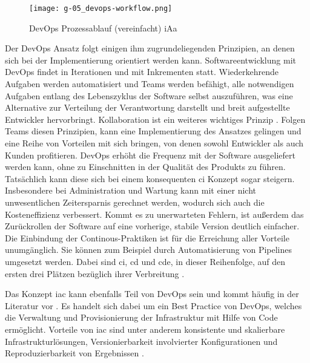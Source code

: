 \begin{figure}[h]
    \centering
    \texttt{[image: g-05\_devops-workflow.png]}
    \caption{DevOps Prozessablauf (vereinfacht) \acrshort{iAa} \citeauthor{008:GitOps-Approach-to-Cloud-Cluster-System-Deployment}}
    \label{fig:g-05_devops-workflow}
\end{figure}

Der DevOps Ansatz folgt einigen ihm zugrundeliegenden Prinzipien, an denen sich bei der Implementierung orientiert werden kann. Softwareentwicklung mit DevOps findet in Iterationen und mit Inkrementen statt. Wiederkehrende Aufgaben werden automatisiert und Teams werden befähigt, alle notwendigen Aufgaben entlang des Lebenszyklus der Software selbst auszuführen, was eine Alternative zur Verteilung der Verantwortung darstellt und breit aufgestellte Entwickler hervorbringt. Kollaboration ist ein weiteres wichtiges Prinzip \cite{009:GitOps-Evolution-of-DevOps}. Folgen Teams diesen Prinzipien, kann eine Implementierung des Ansatzes gelingen und eine Reihe von Vorteilen mit sich bringen, von denen sowohl Entwickler als auch Kunden profitieren. DevOps erhöht die Frequenz mit der Software ausgeliefert werden kann, ohne zu Einschnitten in der Qualität des Produkts zu führen. Tatsächlich kann diese sich bei einem konsequenten \Gls{ci} Konzept sogar steigern. Insbesondere bei Administration und Wartung kann mit einer nicht unwesentlichen Zeitersparnis gerechnet werden, wodurch sich auch die Kosteneffizienz verbessert. Kommt es zu unerwarteten Fehlern, ist außerdem das Zurückrollen der Software auf eine vorherige, stabile Version deutlich einfacher. Die Einbindung der Continous-Praktiken ist für die Erreichung aller Vorteile unumgänglich. Sie können zum Beispiel durch Automatisierung von Pipelines umgesetzt werden. Dabei sind \acrfull{ci}, \acrfull{cd} und \acrfull{cde}, in dieser Reihenfolge, auf den ersten drei Plätzen bezüglich ihrer Verbreitung \cite{001:DevOps-Adoption-in-Software-Development}.

Das Konzept \Gls{iac} kann ebenfalls Teil von DevOps sein und kommt häufig in der Literatur vor \cite{001:DevOps-Adoption-in-Software-Development}. Es handelt sich dabei um ein Best Practice von DevOps, welches die Verwaltung und Provisionierung der Infrastruktur mit Hilfe von Code ermöglicht. Vorteile von \Gls{iac} sind unter anderem konsistente und skalierbare Infrastrukturlösungen, Versionierbarkeit involvierter Konfigurationen und Reproduzierbarkeit von Ergebnissen \cite{012:Compare-and-Contrast-various-Software-Development-Methodologies}.

